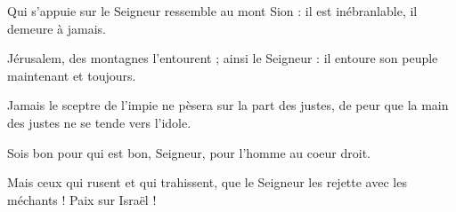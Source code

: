 \item Qui s'appuie sur le Seigneur ressemble au mont Sion : il est inébranlable, il demeure à jamais.

\item Jérusalem, des montagnes l'entourent ; ainsi le Seigneur : il entoure son peuple maintenant et toujours.

\item Jamais le sceptre de l'impie ne pèsera sur la part des justes, de peur que la main des justes ne se tende vers l'idole.

\item Sois bon pour qui est bon, Seigneur, pour l'homme au coeur droit. 

\item Mais ceux qui rusent et qui trahissent, que le Seigneur les rejette avec les méchants ! Paix sur Israël !
